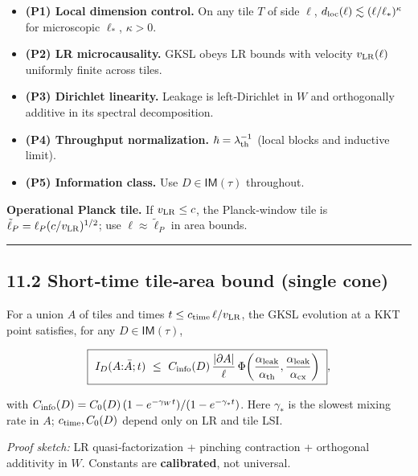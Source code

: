 \documentclass[
]{article}
\providecommand{\tightlist}{%
  \setlength{\itemsep}{0pt}\setlength{\parskip}{0pt}}
\numberwithin{equation}{section}
\begin{document}
\begin{itemize}
\tightlist
\item
  \textbf{(P1) Local dimension control.} On any tile \(T\) of side
  \(\ell\), \(d_{\rm loc}(\ell)\lesssim (\ell/\ell_*)^{\kappa}\) for
  microscopic \(\ell_*\), \(\kappa>0\).
\item
  \textbf{(P2) LR microcausality.} GKSL obeys LR bounds with velocity
  \(v_{\rm LR}(\ell)\) uniformly finite across tiles.
\item
  \textbf{(P3) Dirichlet linearity.} Leakage is left‑Dirichlet in \(W\)
  and orthogonally additive in its spectral decomposition.
\item
  \textbf{(P4) Throughput normalization.}
  \(\hbar=\lambda_{\rm th}^{-1}\) (local blocks and inductive limit).
\item
  \textbf{(P5) Information class.} Use \(D\in\mathsf{IM}(\tau)\)
  throughout.
\end{itemize}

\textbf{Operational Planck tile.} If \(v_{\rm LR}\le c\), the
Planck‑window tile is \(\tilde\ell_P=\ell_P(c/v_{\rm LR})^{1/2}\); use
\(\ell\approx\tilde\ell_P\) in area bounds.

\begin{center}\rule{0.5\linewidth}{0.5pt}\end{center}

\hypertarget{shorttime-tilearea-bound-single-cone}{%
\subsection{11.2 Short‑time tile‑area bound (single
cone)}\label{shorttime-tilearea-bound-single-cone}}

For a union \(A\) of tiles and times
\(t\le c_{\rm time}\,\ell/v_{\rm LR}\), the GKSL evolution at a KKT
point satisfies, for any \(D\in\mathsf{IM}(\tau)\),

\[
\boxed{\ I_D(A{:}\bar A; t)\ \le\ C_{\rm info}(D)\,\frac{|\partial A|}{\ell}\,\Phi\!\left(\frac{\alpha_{\rm leak}}{\alpha_{\rm th}},\frac{\alpha_{\rm leak}}{\alpha_{\rm cx}}\right)\ },
\]

with
\(C_{\rm info}(D)=C_0(D)\,(1-e^{-\gamma_W t})/(1-e^{-\gamma_* t})\).
Here \(\gamma_*\) is the slowest mixing rate in \(A\);
\(c_{\rm time},C_0(D)\) depend only on LR and tile LSI.

\emph{Proof sketch:} LR quasi‑factorization + pinching contraction +
orthogonal additivity in \(W\). Constants are \textbf{calibrated}, not
universal.
\end{document}
